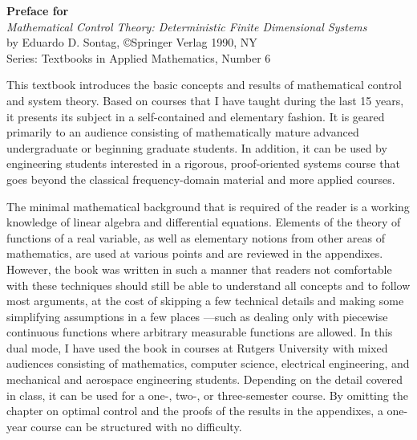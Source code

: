 
\topmargin -0.5in
\textheight 8.8in
\oddsidemargin 0.0in
\evensidemargin 0.0in
\textwidth 6.7in



\begin{center}
{\bf Preface for}\\
{\it Mathematical Control Theory: Deterministic Finite Dimensional Systems}\\
by Eduardo D. Sontag, \copyright Springer Verlag 1990, NY\\
Series: Textbooks in Applied Mathematics, Number 6
\end{center}
This textbook introduces the basic concepts and results of mathematical
control and system theory.  Based on courses that I have taught during the
last 15 years, it presents its subject in a self-contained and elementary
fashion.  It is geared primarily to an audience consisting of mathematically
mature advanced undergraduate or beginning graduate students.  In addition, it
can be used by engineering students interested in a rigorous, proof-oriented
systems course that goes beyond the classical frequency-domain material and
more applied courses.

The minimal mathematical background that is required of the reader is a working
knowledge of linear algebra and differential equations.  Elements of the
theory of functions of a real variable, as well as elementary notions from
other areas of mathematics, are used at various points and are reviewed in the
appendixes.  However, the book was written in such a manner that readers not
comfortable with these techniques should still be able to understand all
concepts and to follow most arguments, at the cost of skipping a few technical
details and making some simplifying assumptions in a few places ---such as
dealing only with piecewise continuous functions where arbitrary measurable
functions are allowed.  In this dual mode, I have used the book in courses at
Rutgers University with mixed audiences consisting of mathematics, computer
science,
electrical engineering, and mechanical and aerospace engineering students.
Depending on the detail covered in class, it can be used for a one-, two-, or
three-semester course.  By omitting the chapter on optimal control and the
proofs of the results in the appendixes, a one-year course can be structured
with no difficulty.

